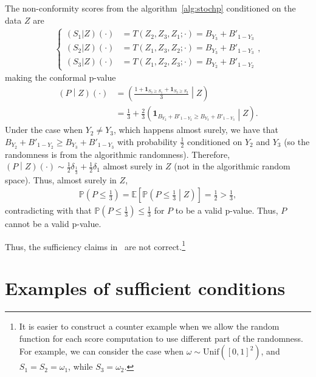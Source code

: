 \documentclass{article}
\newcommand{\expect}[1]{\mathbb{E}\left[ #1 \right]}
\newcommand{\prob}[1]{\mathbb{P}\left( #1 \right)}
\newcommand{\cprob}[2]{\mathbb{P}\left( #1 \middle\vert #2 \right)}
\begin{document}
    The non-conformity scores from the algorithm~\ref{alg:stochp} conditioned on the data $Z$ are
    \begin{align*}
        \begin{cases}
            \left(S_1 \vert Z\right)(\cdot)  &= T\left(Z_2, Z_3, Z_1;\cdot\right)
            = B_{Y_3} + B'_{1-Y_3}
            \\
            \left(S_2 \vert Z\right)(\cdot) &= T\left(Z_1, Z_3, Z_2;\cdot\right)
            = B_{Y_3} + B'_{1-Y_3}\\
            \left(S_3 \vert Z\right)(\cdot)  &= T\left(Z_1, Z_2, Z_3;\cdot\right)
            = B_{Y_2} + B'_{1-Y_2}
        \end{cases},
    \end{align*}
    making the conformal p-value 
    \begin{align*}
        \left(P\middle\vert Z\right)(\cdot) &=
        \left(\frac{1+\mathbf{1}_{S_3 \ge S_1} + \mathbf{1}_{S_3 \ge S_2}}{3} \middle\vert Z\right)\\
        &=
        \frac{1}{3} + \frac{2}{3}
        \left(\mathbf{1}_{B_{Y_2} + B'_{1-Y_2} \ge B_{Y_3} + B'_{1-Y_3}} \middle\vert Z\right).
    \end{align*}
    Under the case when $Y_2 \ne Y_3$, which happens almost surely, we have that $B_{Y_2} + B'_{1-Y_2} \ge B_{Y_3} + B'_{1-Y_3}$ with probability $\frac{1}{2}$ conditioned on $Y_2$ and $Y_3$ (so the randomness is from the algorithmic randomness). Therefore, $\left(P\middle\vert Z\right)(\cdot) \sim \frac{1}{2}\delta_{\frac{1}{3}} + \frac{1}{2}\delta_{1}$ almost surely in $Z$ (not in the algorithmic random space).
    Thus, almost surely in $Z$,
    \begin{align*}
        \prob{P\le \frac{1}{3}} = 
        \expect{\cprob{P\le \frac{1}{3}}{Z}} = \frac{1}{2} > \frac{1}{3},
    \end{align*}
    contradicting with that $\mathbb{P}\left(P \le \frac{1}{3}\right) \le \frac{1}{3}$ for $P$ to be a valid p-value. Thus, $P$ cannot be a valid p-value.

    Thus, the sufficiency claims in~\citep{barber2023conformal,bian2023training,lee2023distribution,bai2024optimized} are not correct.\footnote{It is easier to construct a counter example when we allow the random function for each score computation to use different part of the randomness. For example, we can consider the case when $\omega \sim \text{Unif}([0,1]^2)$, and $S_1=S_2=\omega_1$, while $S_3 = \omega_2$.}

\section{Examples of sufficient conditions}
\end{document}
